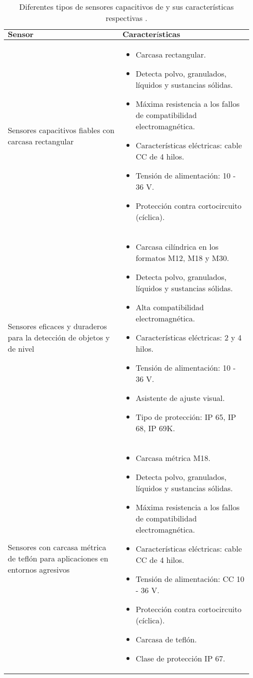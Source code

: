 \begin{table}[H]
	\centering 
	\caption{Diferentes tipos de sensores capacitivos de y sus 
		características respectivas 
		\cite{sensores:proximidad:capacitivos:sick}.}
	\begin{tabular*}{0.9\textwidth}{@{\extracolsep{\fill}} |l|l|}
		\hline
		$\textbf{Sensor}$ & $\textbf{Características}$
		\\\hline \hline
		\parbox[t]{3cm}{Sensores capacitivos fiables con carcasa 
		rectangular
		} & 
		\parbox[t]{10.2cm}{
		\begin{itemize}[noitemsep,topsep=0pt]
		\item Carcasa rectangular.
		\item Detecta polvo, granulados, líquidos y sustancias sólidas.
		\item Máxima resistencia a los fallos de compatibilidad 
			electromagnética.
		\item  Características eléctricas: cable CC de 4 hilos.
		\item Tensión de alimentación: 10 - 36 V.
		\item Protección contra cortocircuito (cíclica).
		\end{itemize}
		} \\\hline
		\parbox[t]{3cm}{Sensores eficaces y duraderos para la detección 
		de objetos y de nivel} &
		\parbox[t]{10.2cm}{
		\begin{itemize}[noitemsep,topsep=0pt]
		\item Carcasa cilíndrica en los formatos M12, M18 y M30.
		\item Detecta polvo, granulados, líquidos y sustancias sólidas.
		\item Alta compatibilidad electromagnética.
		\item Características eléctricas: 2 y 4 hilos.
		\item Tensión de alimentación: 10 - 36 V.
		\item Asistente de ajuste visual.
		\item Tipo de protección: IP 65, IP 68, IP 69K.
		\end{itemize}
		} \\\hline
		\parbox[t]{3cm}{Sensores con carcasa métrica de teflón para 
		aplicaciones en entornos agresivos
		} &
		\parbox[t]{10.2cm}{
		\begin{itemize}[noitemsep,topsep=0pt]
		\item Carcasa métrica M18.
		\item Detecta polvo, granulados, líquidos y sustancias sólidas.
		\item Máxima resistencia a los fallos de compatibilidad 
			electromagnética.
		\item Características eléctricas: cable CC de 4 hilos.
		\item Tensión de alimentación: CC 10 - 36 V.
		\item Protección contra cortocircuito (cíclica).
		\item Carcasa de teflón.
		\item Clase de protección IP 67.
		\end{itemize}
		} \\\hline
	\end{tabular*}
\end{table}
